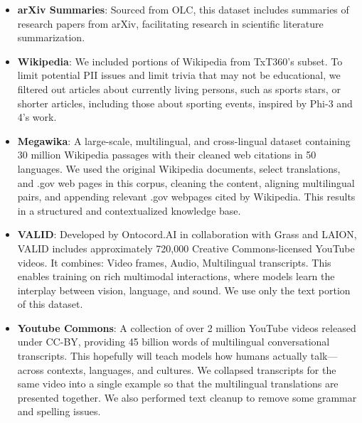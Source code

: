 \begin{itemize}

\item \textbf{arXiv Summaries}: Sourced from OLC, this dataset includes summaries of research papers from arXiv, facilitating research in scientific literature summarization.

\item \textbf{Wikipedia}: We included portions of Wikipedia from TxT360's subset. To limit potential PII issues and limit trivia that may not be educational, we filtered out articles about currently living persons, such as sports stars, or shorter articles, including those about sporting events, inspired by Phi-3 and 4's work. 


\item \textbf{Megawika}: A large-scale, multilingual, and cross-lingual dataset containing 30 million Wikipedia passages with their cleaned web citations in 50 languages. We used the original Wikipedia documents, select translations, and .gov web pages in this corpus, cleaning the content, aligning multilingual pairs, and appending relevant .gov webpages cited by Wikipedia. This results in a structured and contextualized knowledge base.

\item \textbf{VALID}: Developed by Ontocord.AI in collaboration with Grass and LAION, VALID includes approximately 720,000 Creative Commons-licensed YouTube videos. It combines: Video frames, Audio, Multilingual transcripts. This enables training on rich multimodal interactions, where models learn the interplay between vision, language, and sound. We use only the text portion of this dataset.

\item \textbf{Youtube Commons}: A collection of over 2 million YouTube videos released under CC-BY, providing 45 billion words of multilingual conversational transcripts. This hopefully will teach models how humans actually talk—across contexts, languages, and cultures. We collapsed transcripts for the same video into a single example so that the multilingual translations are presented together. We also performed text cleanup to remove some grammar and spelling issues.
\end{itemize}